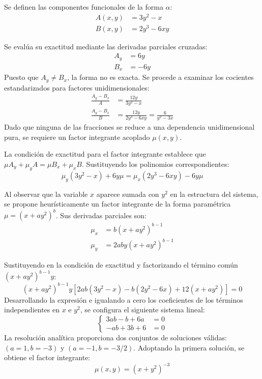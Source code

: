 \begin{tcolorbox}
Se definen las componentes funcionales de la forma $\alpha$:
\begin{align*}
    A(x,y) &= 3y^2 - x \\
    B(x,y) &= 2y^3 - 6xy
\end{align*}

Se evalúa su exactitud mediante las derivadas parciales cruzadas:
\begin{align*}
    A_y &= 6y \\
    B_x &= -6y
\end{align*}
Puesto que $A_y \neq B_x$, la forma no es exacta. Se procede a examinar los cocientes estandarizados para factores unidimensionales:
\begin{align*}
    \frac{A_y - B_x}{A} &= \frac{12y}{3y^2 - x} \\
    \frac{A_y - B_x}{B} &= \frac{12y}{2y^3 - 6xy} = \frac{6}{y^2 - 3x}
\end{align*}
Dado que ninguna de las fracciones se reduce a una dependencia unidimensional pura, se requiere un factor integrante acoplado $\mu(x,y)$.

La condición de exactitud para el factor integrante establece que $\mu A_y + \mu_y A = \mu B_x + \mu_x B$. Sustituyendo los polinomios correspondientes:
$$ \mu_y(3y^2 - x) + 6y\mu = \mu_x(2y^3 - 6xy) - 6y\mu $$

Al observar que la variable $x$ aparece sumada con $y^2$ en la estructura del sistema, se propone heurísticamente un factor integrante de la forma paramétrica $\mu = (x + ay^2)^b$. Sus derivadas parciales son:
\begin{align*}
    \mu_x &= b(x + ay^2)^{b-1} \\
    \mu_y &= 2aby(x + ay^2)^{b-1}
\end{align*}

Sustituyendo en la condición de exactitud y factorizando el término común $(x + ay^2)^{b-1}y$:
$$ (x + ay^2)^{b-1}y [2ab(3y^2 - x) - b(2y^2 - 6x) + 12(x + ay^2)] = 0 $$
Desarrollando la expresión e igualando a cero los coeficientes de los términos independientes en $x$ e $y^2$, se configura el siguiente sistema lineal:
\[
\left\{
\begin{aligned}
    3ab - b + 6a &= 0 \\
    -ab + 3b + 6 &= 0
\end{aligned}
\right.
\]
La resolución analítica proporciona dos conjuntos de soluciones válidas: $(a=1, b=-3)$ y $(a=-1, b=-3/2)$. Adoptando la primera solución, se obtiene el factor integrante:
$$ \mu(x,y) = (x + y^2)^{-3} $$


\end{tcolorbox}
